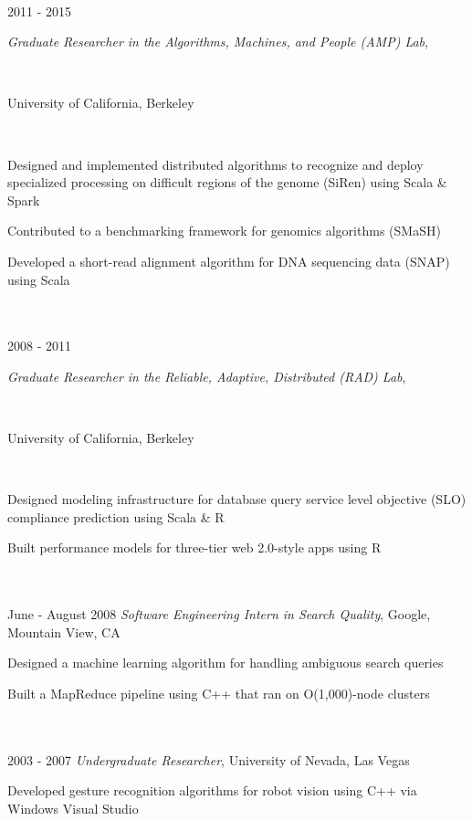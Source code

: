 \documentclass[11pt]{article}
\newcommand{\parwidth}{5.3 in}
\newcommand{\tabwidth}{1.5 in}
\begin{document}
\begin{tabbing}
\hspace{\tabwidth} \= \\ 
2011 - 2015 \> \parbox[t]{\parwidth}{\textit{Graduate Researcher in the Algorithms, Machines, and People (AMP) Lab},}\\
\> \parbox[t]{\parwidth}{University of California, Berkeley}\\
\> \parbox[t]{\parwidth}{
\begin{compactitem}
\item Designed and implemented distributed algorithms to recognize and deploy specialized processing on difficult regions of the genome (SiRen) using Scala \& Spark
\item Contributed to a benchmarking framework for genomics algorithms (SMaSH)
\item Developed a short-read alignment algorithm for DNA sequencing data (SNAP) using Scala
\end{compactitem}
} \\

\hspace{\tabwidth} \= \\ 
2008 - 2011 \> \parbox[t]{\parwidth}{\textit{Graduate Researcher in the Reliable, Adaptive, Distributed (RAD) Lab},}\\
\> \parbox[t]{\parwidth}{University of California, Berkeley}\\
\> \parbox[t]{\parwidth}{
\begin{compactitem}
\item Designed modeling infrastructure for database query service level objective (SLO) compliance prediction using Scala \& R
\item Built performance models for three-tier web 2.0-style apps using R
\end{compactitem}
}\\

\hspace{\tabwidth} \= \\ 
June - August 2008 \> \emph{Software Engineering Intern in Search Quality}, Google, Mountain View, CA \\ 
\> \parbox[t]{\parwidth}{
\begin{compactitem}
\item Designed a machine learning algorithm for handling ambiguous search queries
\item Built a MapReduce pipeline using C++ that ran on O(1,000)-node clusters
\end{compactitem}
}\\

\hspace{\tabwidth} \= \\ 
2003 - 2007 \> \emph{Undergraduate Researcher}, University of Nevada, Las Vegas \\ 
\> \parbox[t]{\parwidth}{
\begin{compactitem}
\item Developed gesture recognition algorithms for robot vision using C++ via Windows Visual Studio
\end{compactitem}
}\\

\end{tabbing}
\end{document}
